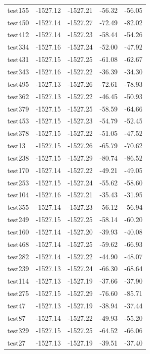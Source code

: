 \documentclass[journal=jacsat,manuscript=article]{achemso}
\begin{document}
\begin{table}[b!]
\begin{tabular}{lrrrr}
test155 &  -1527.12 &  -1527.21 &  -56.32 &  -56.05 \\
test450 &  -1527.14 &  -1527.27 &  -72.49 &  -82.02 \\
test412 &  -1527.14 &  -1527.23 &  -58.44 &  -54.26 \\
test334 &  -1527.16 &  -1527.24 &  -52.00 &  -47.92 \\
test431 &  -1527.15 &  -1527.25 &  -61.08 &  -62.67 \\
test343 &  -1527.16 &  -1527.22 &  -36.39 &  -34.30 \\
test495 &  -1527.13 &  -1527.26 &  -72.61 &  -78.93 \\
test362 &  -1527.13 &  -1527.22 &  -46.45 &  -50.93 \\
test379 &  -1527.15 &  -1527.25 &  -58.59 &  -64.66 \\
test453 &  -1527.15 &  -1527.23 &  -54.79 &  -52.45 \\
test378 &  -1527.15 &  -1527.22 &  -51.05 &  -47.52 \\
test13  &  -1527.15 &  -1527.26 &  -65.79 &  -70.62 \\
test238 &  -1527.15 &  -1527.29 &  -80.74 &  -86.52 \\
test170 &  -1527.14 &  -1527.22 &  -49.21 &  -49.05 \\
test253 &  -1527.15 &  -1527.24 &  -55.62 &  -58.60 \\
test104 &  -1527.16 &  -1527.21 &  -35.43 &  -31.95 \\
test355 &  -1527.14 &  -1527.23 &  -56.12 &  -56.94 \\
test249 &  -1527.15 &  -1527.25 &  -58.14 &  -60.20 \\
test160 &  -1527.14 &  -1527.20 &  -39.93 &  -40.08 \\
test468 &  -1527.14 &  -1527.25 &  -59.62 &  -66.93 \\
test282 &  -1527.14 &  -1527.22 &  -44.90 &  -48.07 \\
test239 &  -1527.13 &  -1527.24 &  -66.30 &  -68.64 \\
test114 &  -1527.13 &  -1527.19 &  -37.66 &  -37.90 \\
test275 &  -1527.15 &  -1527.29 &  -76.60 &  -85.71 \\
test47  &  -1527.13 &  -1527.19 &  -38.94 &  -37.44 \\
test87  &  -1527.14 &  -1527.22 &  -49.93 &  -55.20 \\
test329 &  -1527.15 &  -1527.25 &  -64.52 &  -66.06 \\
test27  &  -1527.13 &  -1527.19 &  -39.51 &  -37.40 \\

\end{tabular}
\end{table}
\end{document}
